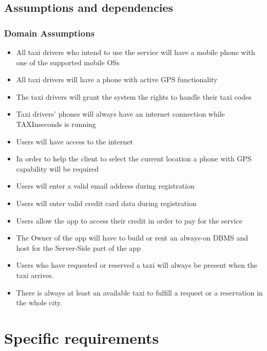 \documentclass{article}
\begin{document}
\subsection{Assumptions and dependencies}
\subsubsection{Domain Assumptions}
\begin{itemize}
	\item All taxi drivers who intend to use the service will have a mobile phone with one of the supported mobile OSs
	\item All taxi drivers will have a phone with active GPS functionality 
	\item The taxi drivers will grant the system the rights to handle their taxi codes
	\item Taxi drivers' phones will always have an internet connection while TAXInseconds is running
	\item Users will have access to the internet
	\item In order to help the client to select the current location a phone with GPS capability will be required %
	\item Users will enter a valid email address during registration 
	\item Users will enter valid credit card data during registration
	\item Users allow the app to access their credit in order to pay for the service
	\item The Owner of the app will have to build or rent an always-on DBMS and host for the Server-Side part of the app %
	\item Users who have requested or reserved a taxi will always be present when the taxi arrives.
	\item There is always at least an available taxi to fulfill a request or a reservation in the whole city.
\end{itemize}
\clearpage
\section{Specific requirements}
\end{document}
